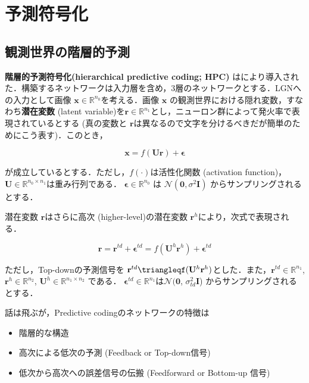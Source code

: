 \section{予測符号化}
\subsection{観測世界の階層的予測}
\textbf{階層的予測符号化(hierarchical predictive coding; HPC)} は\citep{Rao1999-zv}により導入された．構築するネットワークは入力層を含め，3層のネットワークとする．LGNへの入力として画像 $\mathbf{x} \in \mathbb{R}^{n_0}$を考える．画像 $\mathbf{x}$ の観測世界における隠れ変数，すなわち\textbf{潜在変数} (latent variable)を$\mathbf{r} \in \mathbb{R}^{n_1}$とし，ニューロン群によって発火率で表現されているとする (真の変数と $\mathbf{r}$は異なるので文字を分けるべきだが簡単のためにこう表す)．このとき，


\begin{equation}
\mathbf{x} = f(\mathbf{U}\mathbf{r}) + \boldsymbol{\epsilon}
\end{equation}


が成立しているとする．ただし，$f(\cdot)$は活性化関数 (activation function)，$\mathbf{U} \in \mathbb{R}^{n_0 \times n_1}$は重み行列である．
$\boldsymbol{\epsilon} \in \mathbb{R}^{n_0}$ は $\mathcal{N}(\mathbf{0}, \sigma^2 \mathbf{I})$ からサンプリングされるとする．

潜在変数 $\mathbf{r}$はさらに高次 (higher-level)の潜在変数 $\mathbf{r}^h$により，次式で表現される．


\begin{equation}
\mathbf{r} = \mathbf{r}^{td}+\boldsymbol{\epsilon}^{td}=f(\mathbf{U}^h \mathbf{r}^h)+\boldsymbol{\epsilon}^{td}
\end{equation}


ただし，Top-downの予測信号を $\mathbf{r}^{td}\triangleqf(\mathbf{U}^h \mathbf{r}^h)$とした．また，$\mathbf{r}^{td} \in \mathbb{R}^{n_1}$, $\mathbf{r}^{h} \in \mathbb{R}^{n_2}$, $\mathbf{U}^h \in \mathbb{R}^{n_1 \times n_2}$ である．
$\boldsymbol{\epsilon}^{td} \in \mathbb{R}^{n_1}$は$\mathcal{N}(\mathbf{0}$, $\sigma_{td}^2 \mathbf{I}$) からサンプリングされるとする．

話は飛ぶが，Predictive codingのネットワークの特徴は
\begin{itemize}
\item 階層的な構造
\item 高次による低次の予測 (Feedback or Top-down信号)
\item 低次から高次への誤差信号の伝搬 (Feedforward or Bottom-up 信号)
\end{itemize}


